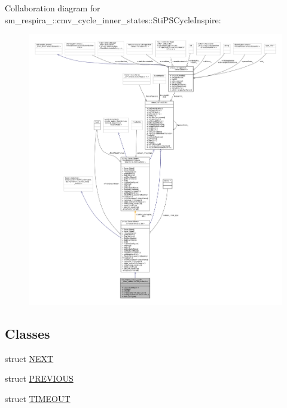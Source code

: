 Collaboration diagram for sm\+\_\+respira\+\_\+:\+:cmv\+\_\+cycle\+\_\+inner\+\_\+states\+:\+:Sti\+P\+S\+Cycle\+Inspire\+:
\nopagebreak
\begin{figure}[H]
\begin{center}
\leavevmode
\includegraphics[width=350pt]{structsm__respira__1_1_1cmv__cycle__inner__states_1_1StiPSCycleInspire__coll__graph}
\end{center}
\end{figure}
\subsection*{Classes}
\begin{DoxyCompactItemize}
\item 
struct \hyperlink{structsm__respira__1_1_1cmv__cycle__inner__states_1_1StiPSCycleInspire_1_1NEXT}{N\+E\+XT}
\item 
struct \hyperlink{structsm__respira__1_1_1cmv__cycle__inner__states_1_1StiPSCycleInspire_1_1PREVIOUS}{P\+R\+E\+V\+I\+O\+US}
\item 
struct \hyperlink{structsm__respira__1_1_1cmv__cycle__inner__states_1_1StiPSCycleInspire_1_1TIMEOUT}{T\+I\+M\+E\+O\+UT}
\end{DoxyCompactItemize}

